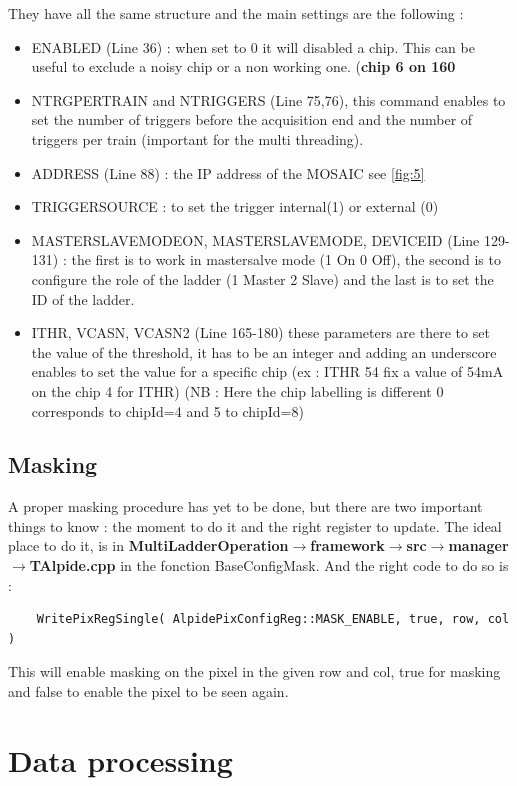 \documentclass[12pt,oneside,a4]{article}
\begin{document}
\bigskip

They have all the same structure and the main settings are the following :
\begin{itemize}
    \item ENABLED  (Line 36) : when set to 0 it will disabled a chip. This can be useful to exclude a noisy chip or a non working one. (\textbf{chip 6 on 160}
    \item NTRGPERTRAIN and NTRIGGERS (Line 75,76), this command enables to set the number of triggers before the acquisition end and the number of triggers per train (important for the multi threading).
    \item ADDRESS (Line 88) : the IP address of the MOSAIC see \ref{fig:5}
    \item TRIGGERSOURCE : to set the trigger internal(1) or external (0)
    \item MASTERSLAVEMODEON, MASTERSLAVEMODE, DEVICEID (Line 129-131) : the first is to work in mastersalve mode (1 On 0 Off), the second is to configure the role of the ladder (1 Master 2 Slave) and the last is to set the ID of the ladder.
    \item ITHR, VCASN, VCASN2 (Line 165-180) these parameters are there to set the value of the threshold, it has to be an integer and adding an underscore enables to set the value for a specific chip (ex : ITHR 54 fix a value of 54mA on the chip 4 for ITHR) (NB : Here the chip labelling is different 0 corresponds to chipId=4 and 5 to chipId=8) 
\end{itemize}
    \subsection{Masking}
A proper masking procedure has yet to be done, but there are two important things to know : the moment to do it and the right register to update. The ideal place to do it, is in \textbf{MultiLadderOperation$\rightarrow$framework$\rightarrow$src$\rightarrow$manager$\rightarrow$TAlpide.cpp} in the fonction BaseConfigMask. And the right code to do so is : 
\begin{verbatim}
    WritePixRegSingle( AlpidePixConfigReg::MASK_ENABLE, true, row, col )
\end{verbatim}
This will enable masking on the pixel in the given row and col, true for masking and false to enable the pixel to be seen again.
\section{Data processing}
\end{document}
